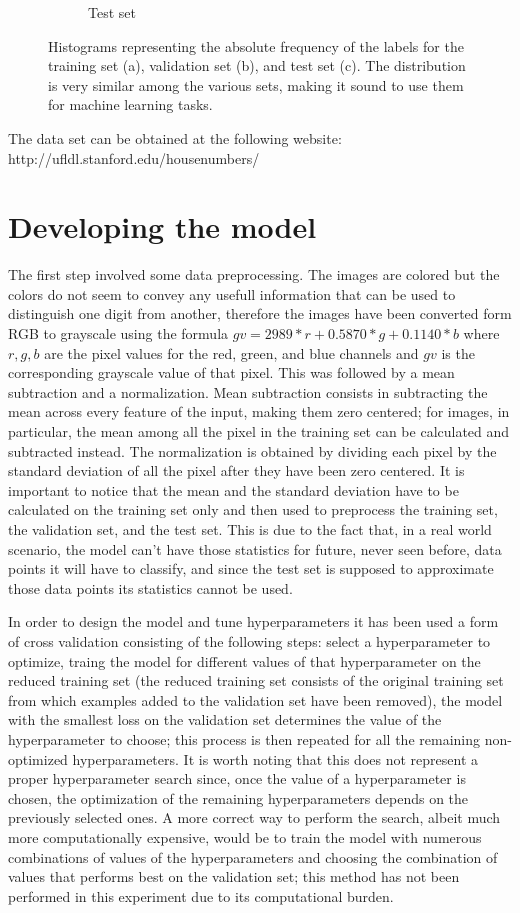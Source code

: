 \documentclass[12pt]{article}
\begin{document}
\begin{figure}[h]
\begin{subfigure}{0.31\textwidth}
		\caption{Test set}
		\label{fig:histc}
	\end{subfigure}
	\caption{Histograms representing the absolute frequency of the labels for the training set (a), validation set (b), and test set (c). The distribution is very similar among the various sets, making it sound to use them for machine learning tasks.}
	\label{fig:hist}
\end{figure}
The data set can be obtained at the following website: http://ufldl.stanford.edu/housenumbers/

\section*{Developing the model}

The first step involved some data preprocessing. The images are colored but the colors do not seem to convey any usefull information that can be used to distinguish one digit from another, therefore the images have been converted form RGB to grayscale using the formula $ gv = 2989*r+0.5870*g+0.1140*b $ where $r, g, b$ are the pixel values for the red, green, and blue channels and $gv$ is the corresponding grayscale value of that pixel. This was followed by a mean subtraction and a normalization. Mean subtraction consists in subtracting the mean across every feature of the input, making them zero centered; for images, in particular, the mean among all the pixel in the training set can be calculated and subtracted instead. The normalization is obtained by dividing each pixel by the standard deviation of all the pixel after they have been zero centered. It is important to notice that the mean and the standard deviation have to be calculated on the training set only and then used to preprocess the training set, the validation set, and the test set. This is due to the fact that, in a real world scenario, the model can't have those statistics for future, never seen before, data points it will have to classify, and since the test set is supposed to approximate  those data points its statistics cannot be used.

In order to design the model and tune hyperparameters it has been used a form of cross validation consisting of the following steps: select a hyperparameter to optimize, traing the model for different values of that hyperparameter on the reduced training set (the reduced training set consists of the original training set from which examples added to the validation set have been removed), the model with the smallest loss on the validation set determines the value of the hyperparameter to choose; this process is then repeated for all the remaining non-optimized hyperparameters. It is worth noting that this does not represent a proper hyperparameter search since, once the value of a hyperparameter is chosen, the optimization of the remaining hyperparameters depends on the previously selected ones. A more correct way to perform the search, albeit much more computationally expensive, would be to train the model with numerous combinations of values of the hyperparameters and choosing the combination of values that performs best on the validation set; this method has not been performed in this experiment due to its computational burden.
\end{document}
